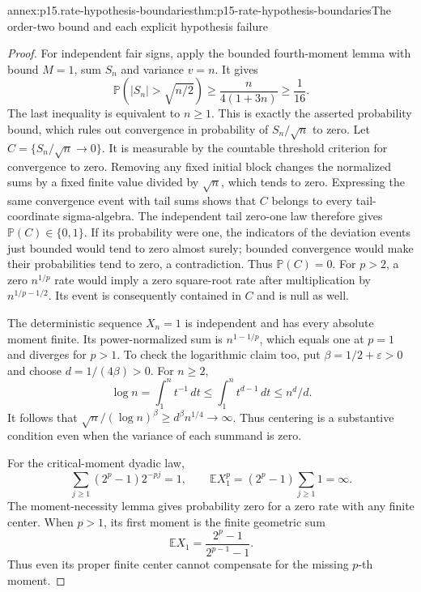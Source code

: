 \begin{annexitem}{annex:p15.rate-hypothesis-boundaries}{thm:p15-rate-hypothesis-boundaries}{The order-two bound and each explicit hypothesis failure}
\begin{proof}
For independent fair signs, apply the bounded fourth-moment lemma
with bound \(M=1\), sum \(S_n\) and variance \(v=n\).
It gives
\[
 \mathbb P(|S_n|>\sqrt{n/2})
      \geq\frac{n}{4(1+3n)}\geq\frac1{16}.
\]
The last inequality is equivalent to \(n\geq1\).
This is exactly the asserted probability bound, which rules out
convergence in probability of \(S_n/\sqrt n\) to zero.
Let \(C=\{S_n/\sqrt n\to0\}\). It is measurable by the
countable threshold criterion for convergence to zero.
Removing any fixed initial block changes the normalized sums by
a fixed finite value divided by \(\sqrt n\), which tends to
zero. Expressing the same convergence event with tail sums shows
that \(C\) belongs to every tail-coordinate sigma-algebra.
The independent tail zero-one law therefore gives
\(\mathbb P(C)\in\{0,1\}\).
If its probability were one, the indicators of the deviation
events just bounded would tend to zero almost surely; bounded
convergence would make their probabilities tend to zero, a
contradiction. Thus \(\mathbb P(C)=0\).
For \(p>2\), a zero \(n^{1/p}\) rate would imply a zero
square-root rate after multiplication by \(n^{1/p-1/2}\).
Its event is consequently contained in \(C\) and is null as well.

The deterministic sequence \(X_n=1\) is independent and has every
absolute moment finite. Its power-normalized sum is
\(n^{1-1/p}\), which equals one at \(p=1\) and diverges for
\(p>1\). To check the logarithmic claim too, put
\(\beta=1/2+\varepsilon>0\) and choose \(d=1/(4\beta)>0\).
For \(n\geq2\),
\[
 \log n=\int_1^n t^{-1}\,dt
       \leq\int_1^n t^{d-1}\,dt
       \leq n^d/d.
\]
It follows that
\(\sqrt n/(\log n)^\beta\geq d^\beta n^{1/4}\to\infty\).
Thus centering is a substantive condition even when the variance
of each summand is zero.

For the critical-moment dyadic law,
\[
 \sum_{j\geq1}(2^p-1)2^{-pj}=1,\qquad
 \mathbb E X_1^p=(2^p-1)\sum_{j\geq1}1=\infty.
\]
The moment-necessity lemma gives probability zero for a zero rate
with any finite center. When \(p>1\), its first moment is the
finite geometric sum
\[
 \mathbb EX_1=\frac{2^p-1}{2^{p-1}-1}.
\]
Thus even its proper finite center cannot compensate for the missing
\(p\)-th moment.


\end{proof}
\end{annexitem}
